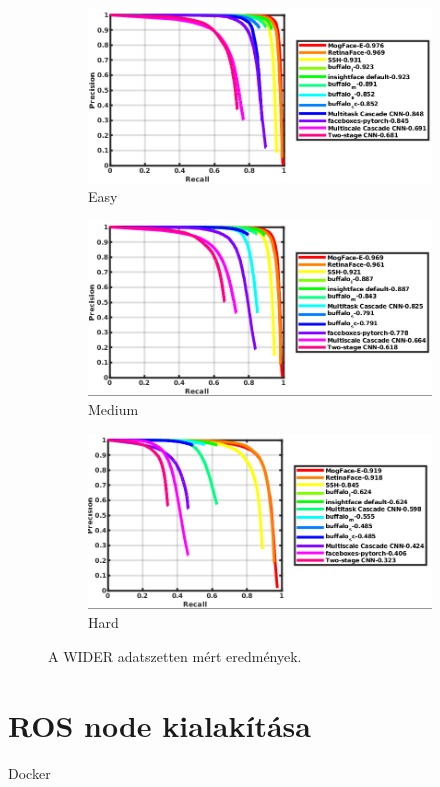 \begin{figure}
    \centering
    \begin{subfigure}[b]{0.75\linewidth}
        \includegraphics[width=\linewidth]{figures/wider_easy.png}
        \caption{Easy}
    \end{subfigure}
    \begin{subfigure}[b]{0.75\linewidth}
        \includegraphics[width=\linewidth]{figures/wider_medium.png}
        \caption{Medium}
    \end{subfigure}
    \begin{subfigure}[b]{0.75\linewidth}
        \includegraphics[width=\linewidth]{figures/wider_hard.png}
        \caption{Hard}
    \end{subfigure}
    \caption{A WIDER adatszetten mért eredmények.}
    \label{fig:wider_evaluation}
\end{figure}

\section{ROS node kialakítása}
Docker